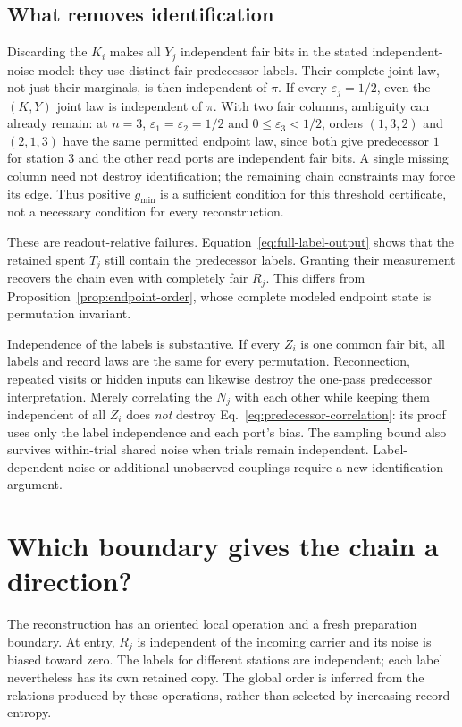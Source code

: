 \documentclass[12pt,a4paper]{article}
\begin{document}
\subsection{What removes identification}

Discarding the $K_i$ makes all $Y_j$ independent fair bits in the
stated independent-noise model: they use distinct fair predecessor
labels. Their complete joint law, not just their marginals, is then
independent of $\pi$. If every $\varepsilon_j=1/2$, even the
$(K,Y)$ joint law is independent of $\pi$.
With two fair columns, ambiguity can already remain: at $n=3$,
$\varepsilon_1=\varepsilon_2=1/2$ and
$0\le\varepsilon_3<1/2$, orders $(1,3,2)$ and $(2,1,3)$ have the
same permitted endpoint law, since both give predecessor $1$ for
station $3$ and the other read ports are independent fair bits.
A single missing column need not destroy identification; the remaining
chain constraints may force its edge. Thus positive $g_{\min}$ is
a sufficient condition for this threshold certificate, not a necessary
condition for every reconstruction.

These are readout-relative failures. Equation~\eqref{eq:full-label-output}
shows that the retained spent $T_j$ still contain the predecessor
labels. Granting their measurement recovers the chain even with
completely fair $R_j$. This differs from
Proposition~\ref{prop:endpoint-order}, whose complete modeled endpoint
state is permutation invariant.

Independence of the labels is substantive. If every $Z_i$ is one
common fair bit, all labels and record laws are the same for every
permutation. Reconnection, repeated visits or hidden inputs can likewise
destroy the one-pass predecessor interpretation. Merely correlating the
$N_j$ with each other while keeping them independent of all $Z_i$
does \emph{not} destroy Eq.~\eqref{eq:predecessor-correlation}:
its proof uses only the label independence and each port's bias.
The sampling bound also survives within-trial shared noise when
trials remain independent. Label-dependent noise or additional
unobserved couplings require a new identification argument.

\section{Which boundary gives the chain a direction?}
\label{sec:direction-boundary}

The reconstruction has an oriented local operation and a fresh
preparation boundary. At entry, $R_j$ is independent of the incoming
carrier and its noise is biased toward zero. The labels for different
stations are independent; each label nevertheless has its own retained
copy. The global order is inferred from the relations produced by
these operations, rather than selected by increasing record entropy.
\end{document}
